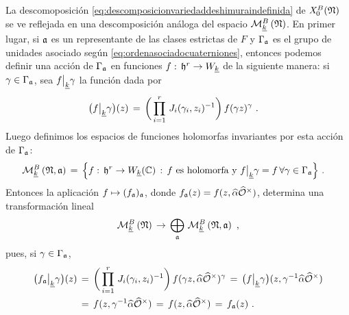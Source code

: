 
La descomoposici\'{o}n \eqref{eq:descomposicionvariedaddeshimuraindefinida} de
$\shimura[B]{\frak{N}}$ se ve reflejada en una descomposici\'{o}n an\'{a}loga
del espacio $\modularH[B]{k}{\frak{N}}$. En primer lugar, si $\frak{a}$ es un
representante de las clases estrictas de $F$ y $\Gamma_{\frak{a}}$ es el grupo
de unidades asociado seg\'{u}n \eqref{eq:ordenasociadocuaterniones},
entonces podemos definir una acci\'{o}n de $\Gamma_{\frak{a}}$ en funciones
$f:\,\hP^{r}\rightarrow W_{\peso{k}}$ de la siguiente manera: si
$\gamma\in\Gamma_{\frak{a}}$, sea $f\operadormatrices{\peso{k}}{\gamma}$ la
funci\'{o}n dada por
\begin{align*}
	\big(f\operadormatrices{\peso{k}}{\gamma}\big)(z) & \,=\,
		\bigg(\prod_{i=1}^{r}\,J_{i}(\gamma_{i},z_{i})^{-1}\bigg)\,
			f(\gamma z)^{\gamma}
	\text{ .}
\end{align*}
%
Luego definimos los espacios de funciones holomorfas invariantes por esta
acci\'{o}n de $\Gamma_{\frak{a}}$:
\begin{align*}
	\modularH[B]{k}{\frak{N},\frak{a}} & \,=\,
		\Big\{ f:\,\hP^{r}\rightarrow W_{\peso{k}}(\bb{C}) \,:\,
			f\text{ es holomorfa y }
			f\operadormatrices{\peso{k}}{\gamma}=f\,
			\forall\gamma\in\Gamma_{\frak{a}}
			\Big\}
	\text{ .}
\end{align*}
%
Entonces la aplicaci\'{o}n $f\mapsto (f_{\frak{a}})_{\frak{a}}$, donde
$f_{\frak{a}}(z)=f(z,\hhat{\alpha}\Idfin{\cal{O}})$, determina una
transformaci\'{o}n lineal
\begin{equation}
	\label{eq:descomposicionmodularesindefinida}
	\modularH[B]{k}{\frak{N}}\,\rightarrow\,
		\bigoplus_{\frak{a}}\,\modularH[B]{k}{\frak{N},\frak{a}}
	\text{ ,}
\end{equation}
%
pues, si $\gamma\in\Gamma_{\frak{a}}$,
\begin{align*}
	\big(f_{\frak{a}}\operadormatrices{\peso{k}}{\gamma}\big)(z)
	& \,=\,\bigg(\prod_{i=1}^{r}\,J_{i}(\gamma_{i},z_{i})^{-1}
		\bigg)\,f(\gamma z,\hhat{\alpha}\Idfin{\cal{O}})^{\gamma}
		\,=\, \big(f\operadormatrices{\peso{k}}{\gamma}\big)
			(z,\gamma^{-1}\hhat{\alpha}\Idfin{\cal{O}}) \\
	& \,=\, f(z,\gamma^{-1}\hhat{\alpha}\Idfin{\cal{O}})
		\,=\, f(z,\hhat{\alpha}\Idfin{\cal{O}})
		\,=\, f_{\frak{a}}(z)
	\text{ .}
\end{align*}

